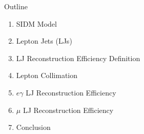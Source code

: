 \documentclass{beamer}
\begin{document}
%
%
\begin{frame}{Outline}
\begin{enumerate}

    \item SIDM Model
    \item Lepton Jets (LJs)
    \item LJ Reconstruction Efficiency Definition
    \item Lepton Collimation
    \item $e\gamma$ LJ Reconstruction Efficiency
    \item $\mu$ LJ Reconstruction Efficiency
    \item Conclusion

\end{enumerate}
\end{frame}
\end{document}

